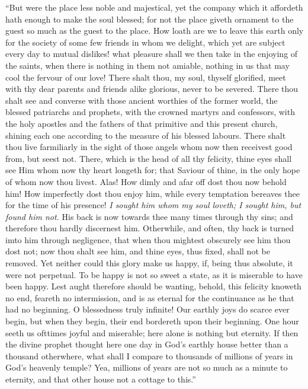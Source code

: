 ``But were the place less noble and majestical, yet the company which it affordeth hath enough to make the soul blessed; for not the place giveth ornament to the guest so much as the guest to the place. How loath are we to leave this earth only for the society of some few friends in whom we delight, which yet are subject every day to mutual dislikes! what pleasure shall we then take in the enjoying of the saints, when there is nothing in them not amiable, nothing in us that may cool the fervour of our love! There shalt thou, my soul, thyself glorified, meet with thy dear parents and friends alike glorious, never to be severed. There thou shalt see and converse with those ancient worthies of the former world, the blessed patriarchs and prophets, with the crowned martyrs and confessors, with the holy apostles and the fathers of that primitive and this present church, shining each one according to the measure of his blessed labours. There shalt thou live farmiliarly in the sight of those angels whom now then receivest good from, but seest not. There, which is the head of all thy felicity, thine eyes shall see Him whom now thy heart longeth for; that Saviour of thine, in the only hope of whom now thou livest. Alas! How dimly and afar off dost thou now behold him! How imperfectly dost thou enjoy him, while every temptation bereaves thee for the time of his presence! \emph{I sought him whom my soul loveth; I sought him, but found him not.} His back is now towards thee many times through thy sins; and therefore thou hardly discernest him. Otherwhile, and often, thy back is turned imto him through negligence, that when thou mightest obscurely see him thou dost not; now thou shalt see him, and thine eyes, thus fixed, shall not be removed. Yet neither could this glory make us happy, if, being thus absolute, it were not perpetual. To be happy is not so sweet a state, as it is miserable to have been happy. Lest aught therefore should be wanting, behold, this felicity knoweth no end, feareth no intermission, and is as eternal for the continuance as he that had no beginning. O blessedness truly infinite! Our earthly joys do scarce ever begin, but when they begin, their end bordereth upon their beginning. One hour seeth us ofttimes joyful and miserable; here alone is nothing but eternity. If then the divine prophet thought here one day in God's earthly house better than a thousand otherwhere, what shall I compare to thousands of millions of years in God's heavenly temple? Yea, millions of years are not so much as a minute to eternity, and that other house not a cottage to this.''

